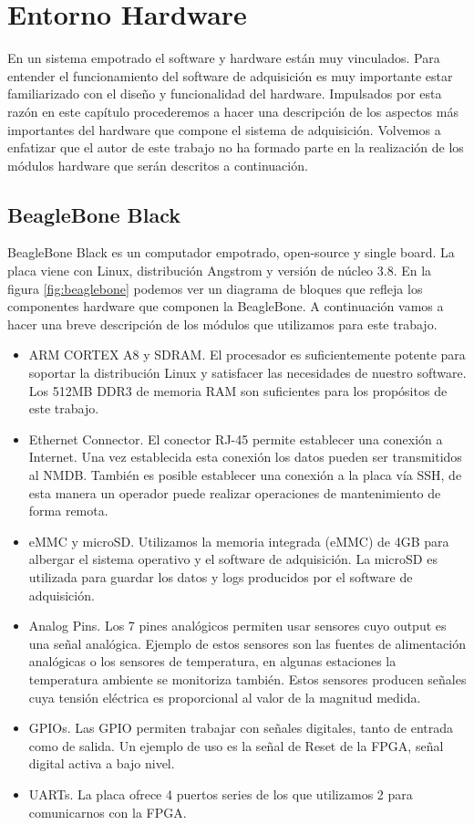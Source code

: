 \chapter{Entorno Hardware}
\label{entornoHW}

En un sistema empotrado el software y hardware están muy vinculados. Para entender el funcionamiento del software de adquisición es muy importante
estar familiarizado con el diseño y funcionalidad del hardware. Impulsados por esta razón en este capítulo procederemos a hacer una descripción de los
aspectos más importantes del hardware que compone el sistema de adquisición. Volvemos a enfatizar que el autor de este trabajo no ha formado parte en
la realización de los módulos hardware que serán descritos a continuación.
\section{BeagleBone Black}
	BeagleBone Black\cite{Beagle}\cite{BeagleWiki} es un computador empotrado, open-source y single board. La placa viene con Linux, distribución
	Angstrom y versión de núcleo 3.8. En la figura \ref{fig:beaglebone} podemos ver un diagrama de bloques que refleja los componentes hardware
	que componen la BeagleBone. A continuación vamos a hacer una breve descripción de los módulos que utilizamos para este trabajo.
	\begin{itemize}
		\item 	ARM CORTEX A8\cite{BeagleCore} y SDRAM. El procesador es suficientemente potente para soportar la distribución Linux y
			satisfacer las necesidades de nuestro software. Los 512MB DDR3 de memoria RAM son suficientes para los propósitos de este
			trabajo.
		\item 	Ethernet Connector. El conector RJ-45 permite establecer una conexión a Internet. Una vez establecida esta conexión los datos
			pueden ser transmitidos al NMDB. También es posible establecer una conexión a la placa vía SSH, de esta manera un operador
			puede realizar operaciones de mantenimiento de forma remota.
		\item	eMMC y microSD. Utilizamos la memoria integrada (eMMC) de 4GB para albergar el sistema operativo y el software de
			adquisición. La microSD es utilizada para guardar los datos y logs producidos por el software de adquisición.
		\item 	Analog Pins. Los 7 pines analógicos permiten usar sensores cuyo output es una señal analógica. Ejemplo de estos sensores son
			las fuentes de alimentación analógicas o los sensores de temperatura, en algunas estaciones la temperatura ambiente se
			monitoriza también. Estos sensores producen señales cuya tensión eléctrica es proporcional al valor de la magnitud medida. 
		\item 	GPIOs. Las GPIO permiten trabajar con señales digitales, tanto de entrada como de salida. Un ejemplo de uso es la señal de
		  	Reset de la FPGA, señal digital activa a bajo nivel.
		\item	UARTs. La placa ofrece 4 puertos series de los que utilizamos 2 para comunicarnos con la FPGA.
	\end{itemize}
